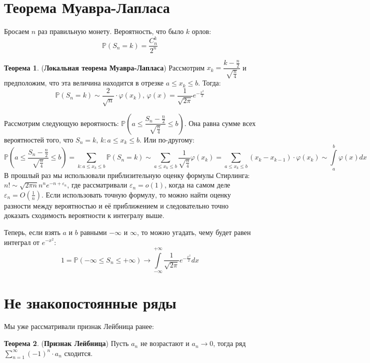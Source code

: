 \documentclass[12pt]{article}
\newcommand{\RN}[1]{%
	\textup{\uppercase\expandafter{\romannumeral#1}}%
}
\theoremstyle{definition}
\newtheorem{theorem}{Теорема}
\newcommand{\ddint}[2]{\displaystyle\int\limits_{#1}^{#2}}
\begin{document}
\lhead{Математический анализ - \RN{3}}

\section*{Теорема Муавра-Лапласа}
Бросаем $n$ раз правильную монету. Вероятность, что было $k$ орлов:
$$
	\mathbb{P}(S_n = k) = \dfrac{C_n^k}{2^n}
$$
\begin{theorem}(\textbf{Локальная теорема Муавра-Лапласа})
	Рассмотрим $x_k = \dfrac{k - \tfrac{n}{2}}{\sqrt{\tfrac{n}{4}}}$ и предположим, что эта величина находится в отрезке $a \leq x_k \leq b$. Тогда:
	$$
		\mathbb{P}(S_n = k) \sim \dfrac{2}{\sqrt{n}}{\cdot}\varphi(x_k), \, \varphi(x) = \dfrac{1}{\sqrt{2\pi}}e^{-\tfrac{x^2}{2}}
	$$
\end{theorem}
Рассмотрим следующую вероятность: $\mathbb{P}\left(a \leq \dfrac{S_n - \tfrac{n}{2}}{\sqrt{\tfrac{n}{4}}} \leq b\right)$. Она равна сумме всех вероятностей того, что $S_n = k, \, k \colon a \leq x_k \leq b$. Или по-другому:
$$
	\mathbb{P}\left(a \leq \dfrac{S_n - \tfrac{n}{2}}{\sqrt{\tfrac{n}{4}}} \leq b\right) = \sum\limits_{k \colon a \leq x_k \leq b}\mathbb{P}(S_n = k) \sim \sum\limits_{a \leq x_k \leq b}\dfrac{1}{\sqrt{\tfrac{n}{4}}}\varphi(x_k) = \sum\limits_{a \leq x_k \leq b}(x_k - x_{k-1}){\cdot}\varphi(x_k) \sim \ddint{a}{b} \varphi(x)dx
$$
В прошлый раз мы использовали приблизительную оценку формулы Стирлинга: $n! \sim \sqrt{2\pi n} n^n e^{-n + \varepsilon_n}$, где рассматривали $\varepsilon_n  = o(1)$, когда на самом деле $\varepsilon_n = O\left(\tfrac{1}{n}\right)$. Если использовать точную формулу, то можно найти оценку разности между вероятностью и её приближением и следовательно точно доказать сходимость вероятности к интегралу выше. 

Теперь, если взять $a$ и $b$ равными $-\infty$ и $\infty$, то можно угадать, чему будет равен интеграл от $e^{-x^2}$:
$$
	1 = \mathbb{P}\left(-\infty \leq S_n \leq +\infty\right) \to \ddint{-\infty}{+\infty}\dfrac{1}{\sqrt{2\pi}}e^{-\tfrac{x^2}{2}}dx
$$
\newpage
\section*{Не знакопостоянные ряды}
Мы уже рассматривали признак Лейбница ранее:
\begin{theorem}(\textbf{Признак Лейбница})
	Пусть $a_n$ не возрастают и $a_n \to 0$, тогда ряд $\displaystyle \sum\limits_{n = 1}^{\infty}(-1)^n{\cdot}a_n$ сходится.
\end{theorem}
\end{document}
